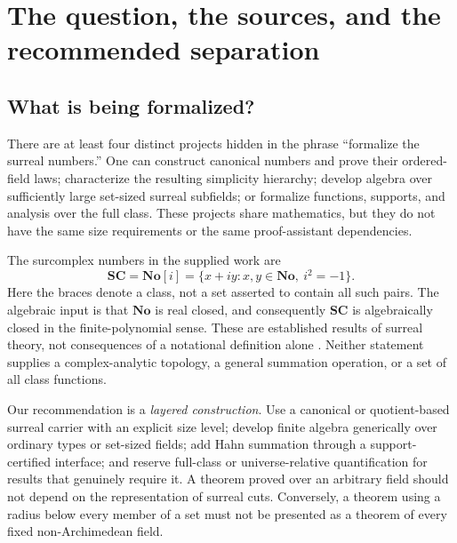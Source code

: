 \documentclass[11pt,letterpaper]{article}
\numberwithin{equation}{section}
\theoremstyle{definition}
\theoremstyle{remark}
\newcommand{\No}{\mathbf{No}}
\newcommand{\SC}{\mathbf{SC}}
\begin{document}
\hypersetup{pageanchor=true}
\tableofcontents
\clearpage
{}

\section{The question, the sources, and the recommended separation}\label{sec:scope}

\subsection{What is being formalized?}
There are at least four distinct projects hidden in the phrase ``formalize the surreal numbers.'' One can construct canonical numbers and prove their ordered-field laws; characterize the resulting simplicity hierarchy; develop algebra over sufficiently large set-sized surreal subfields; or formalize functions, supports, and analysis over the full class. These projects share mathematics, but they do not have the same size requirements or the same proof-assistant dependencies.

The surcomplex numbers in the supplied work are
\[
\SC=\No[i]=\{x+iy:x,y\in\No,\ i^2=-1\}.
\]
Here the braces denote a class, not a set asserted to contain all such pairs. The algebraic input is that $\No$ is real closed, and consequently $\SC$ is algebraically closed in the finite-polynomial sense. These are established results of surreal theory, not consequences of a notational definition alone \cite{Conway,Gonshor}. Neither statement supplies a complex-analytic topology, a general summation operation, or a set of all class functions.

Our recommendation is a \emph{layered construction}. Use a canonical or quotient-based surreal carrier with an explicit size level; develop finite algebra generically over ordinary types or set-sized fields; add Hahn summation through a support-certified interface; and reserve full-class or universe-relative quantification for results that genuinely require it. A theorem proved over an arbitrary field should not depend on the representation of surreal cuts. Conversely, a theorem using a radius below every member of a set must not be presented as a theorem of every fixed non-Archimedean field.
\end{document}
